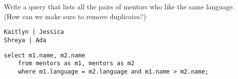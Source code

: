 \begin{blocksection}
\question Write a query that lists all the pairs of mentors who like the same language. (How can we make sure to remove duplicates?)

\begin{lstlisting}
Kaitlyn | Jessica
Shreya | Ada
\end{lstlisting}

\begin{solution}[1in]
\begin{lstlisting}
select m1.name, m2.name
    from mentors as m1, mentors as m2
    where m1.language = m2.language and m1.name > m2.name;
\end{lstlisting}
\end{solution}
\end{blocksection}
